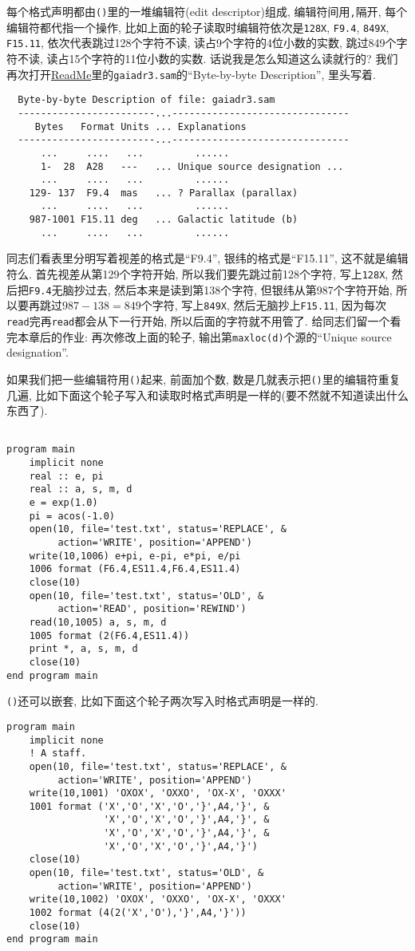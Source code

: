 每个格式声明都由\texttt{()}里的一堆编辑符(edit descriptor)组成, 编辑符间用\texttt{,}隔开, 每个编辑符都代指一个操作, 比如上面的轮子读取时编辑符依次是\texttt{128X}, \texttt{F9.4}, \texttt{849X}, \texttt{F15.11}, 依次代表跳过128个字符不读, 读占9个字符的4位小数的实数, 跳过849个字符不读, 读占15个字符的11位小数的实数. 话说我是怎么知道这么读就行的? 我们再次打开\href{https://cdsarc.cds.unistra.fr/viz-bin/ReadMe/I/355?format=html&tex=true}{ReadMe}里的\texttt{gaiadr3.sam}的``Byte-by-byte Description'', 里头写着.
\begin{lstlisting}
  Byte-by-byte Description of file: gaiadr3.sam
  ------------------------...-------------------------------
     Bytes   Format Units ... Explanations
  ------------------------...-------------------------------
      ...     ....   ...         ......
      1-  28  A28   ---   ... Unique source designation ...
      ...     ....   ...         ......
    129- 137  F9.4  mas   ... ? Parallax (parallax)
      ...     ....   ...         ......
    987-1001 F15.11 deg   ... Galactic latitude (b)
      ...     ....   ...         ......
\end{lstlisting}
同志们看表里分明写着视差的格式是``F9.4'', 银纬的格式是``F15.11'', 这不就是编辑符么. 首先视差从第129个字符开始, 所以我们要先跳过前128个字符, 写上\texttt{128X}, 然后把\texttt{F9.4}无脑抄过去, 然后本来是读到第138个字符, 但银纬从第987个字符开始, 所以要再跳过$987-138=849$个字符, 写上\texttt{849X}, 然后无脑抄上\texttt{F15.11}, 因为每次\texttt{read}完再\texttt{read}都会从下一行开始, 所以后面的字符就不用管了. 给同志们留一个看完本章后的作业: 再次修改上面的轮子, 输出第\texttt{maxloc(d)}个源的``Unique source designation''.

如果我们把一些编辑符用\texttt{()}起来, 前面加个数, 数是几就表示把\texttt{()}里的编辑符重复几遍, 比如下面这个轮子写入和读取时格式声明是一样的(要不然就不知道读出什么东西了).
\begin{lstlisting}

program main
    implicit none
    real :: e, pi
    real :: a, s, m, d
    e = exp(1.0)
    pi = acos(-1.0)
    open(10, file='test.txt', status='REPLACE', &
         action='WRITE', position='APPEND')
    write(10,1006) e+pi, e-pi, e*pi, e/pi
    1006 format (F6.4,ES11.4,F6.4,ES11.4)
    close(10)
    open(10, file='test.txt', status='OLD', &
         action='READ', position='REWIND')
    read(10,1005) a, s, m, d
    1005 format (2(F6.4,ES11.4))
    print *, a, s, m, d
    close(10)
end program main
\end{lstlisting}
\texttt{()}还可以嵌套, 比如下面这个轮子两次写入时格式声明是一样的.
\begin{lstlisting}
program main
    implicit none
    ! A staff.
    open(10, file='test.txt', status='REPLACE', &
         action='WRITE', position='APPEND')
    write(10,1001) 'OXOX', 'OXXO', 'OX-X', 'OXXX'
    1001 format ('X','O','X','O','}',A4,'}', &
                 'X','O','X','O','}',A4,'}', &
                 'X','O','X','O','}',A4,'}', &
                 'X','O','X','O','}',A4,'}')
    close(10)
    open(10, file='test.txt', status='OLD', &
         action='WRITE', position='APPEND')
    write(10,1002) 'OXOX', 'OXXO', 'OX-X', 'OXXX'
    1002 format (4(2('X','O'),'}',A4,'}'))
    close(10)
end program main
\end{lstlisting}

